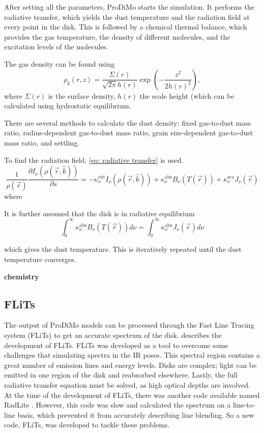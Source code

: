 \documentclass[oneside, single, authoryear, semicolon, 12pt]{lion-msc}
\renewcommand{\vec}[1] {\ensuremath{ \overrightarrow{ #1 } }}
\newcommand{\4}{$_4$}
\newcommand{\3}{$_3$}
\newcommand{\2}{$_2$}
\begin{document}
After setting all the parameters, ProDiMo starts the simulation. It performs the radiative transfer, which yields the dust temperature and the radiation field at every point in the disk. This is followed by a chemical thermal balance, which provides the gas temperature, the density of different molecules, and the excitation levels of the molecules. 

The gas density can be found using
\begin{equation}
    \rho_\mathrm{g}(r,z)=\frac{\Sigma(r)}{\sqrt{2\pi}h(r)}\exp{\left(-\frac{z^2}{2h(r)^2}\right)},
    \label{eq: density}
\end{equation}
where $\Sigma(r)$ is the surface density, $h(r)$ the scale height (which can be calculated using hydrostatic equilibrium. 

There are several methods to calculate the dust density: fixed gas-to-dust mass ratio, radius-dependent gas-to-dust mass ratio, grain size-dependent gas-to-dust mass ratio, and settling. 

To find the radiation field, \autoref{eq: radiative transfer} is used.
\begin{equation}
    \frac{1}{\rho(\vec{r})}\frac{\partial I_\nu(\rho(\vec{r}, \hat{k}))}{\partial s}=-\kappa^{\mathrm{ext}}_\nu I_\nu(\rho(\vec{r}, \hat{k})) + \kappa^{\mathrm{abs}}_\nu B_\nu(T(\vec{r})) + \kappa^{\mathrm{sca}}_\nu J_\nu(\vec{r})
    \label{eq: radiative transfer}
\end{equation}
where 

It is further assumed that the disk is in radiative equilibrium 
\begin{equation}
    \int^\infty_0\kappa^{\mathrm{abs}}_\nu B_\nu(T(\vec{r}))d\nu=\int^\infty_0\kappa^{\mathrm{abs}}_\nu J_\nu(\vec{r})d\nu
\end{equation}

which gives the dust temperature. This is iteratively repeated until the dust temperature converges.

\textbf{chemistry}

\subsection{FLiTs}
The output of ProDiMo models can be processed through the Fast Line Tracing system (FLiTs) to get an accurate spectrum of the disk. \cite{Woitke_2018} describes the development of FLiTs. FLiTs was developed as a tool to overcome some challenges that simulating spectra in the IR poses. This spectral region contains a great number of emission lines and energy levels. Disks are complex; light can be emitted in one region of the disk and reabsorbed elsewhere. Lastly, the full radiative transfer equation must be solved, as high optical depths are involved. At the time of the development of FLiTs, there was another code available named RadLite \citep{Pontoppidan_2009}. However, this code was slow and 
calculated the spectrum on a line-to-line basis, which prevented it from accurately describing line blending. So a new code, FLiTs, was developed to tackle these problems. 
\end{document}
